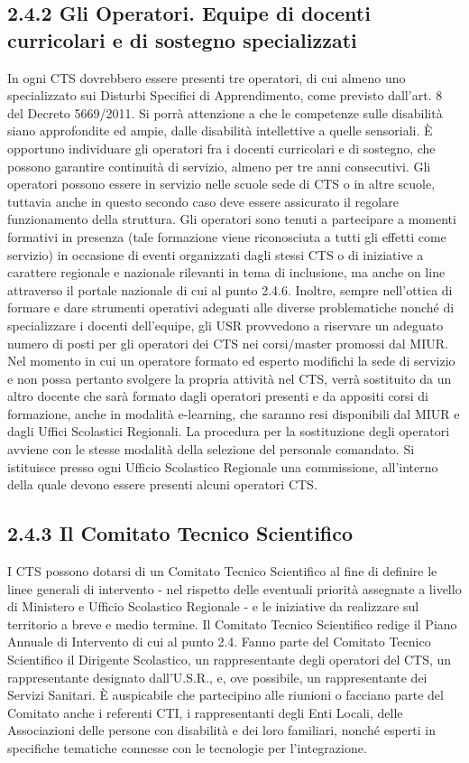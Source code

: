 \subsection*{2.4.2 Gli Operatori. Equipe di docenti curricolari e di sostegno specializzati}
In ogni CTS dovrebbero essere presenti tre operatori, di cui almeno uno specializzato sui Disturbi Specifici
di Apprendimento, come previsto dall'art. 8 del Decreto 5669/2011. Si porrà attenzione a che le competenze
sulle disabilità siano approfondite ed ampie, dalle disabilità intellettive a quelle sensoriali.
È opportuno individuare gli operatori fra i docenti curricolari e di sostegno, che possono garantire continuità
di servizio, almeno per tre anni consecutivi.
Gli operatori possono essere in servizio nelle scuole sede di CTS o in altre scuole, tuttavia anche in questo
secondo caso deve essere assicurato il regolare funzionamento della struttura.
Gli operatori sono tenuti a partecipare a momenti formativi in presenza (tale formazione viene riconosciuta a
tutti gli effetti come servizio) in occasione di eventi organizzati dagli stessi CTS o di iniziative a carattere
regionale e nazionale rilevanti in tema di inclusione, ma anche on line attraverso il portale nazionale di cui al
punto 2.4.6.
Inoltre, sempre nell'ottica di formare e dare strumenti operativi adeguati alle diverse problematiche nonché
di specializzare i docenti dell'equipe, gli USR provvedono a riservare un adeguato numero di posti per gli
operatori dei CTS nei corsi/master promossi dal MIUR.
Nel momento in cui un operatore formato ed esperto modifichi la sede di servizio e non possa pertanto
svolgere la propria attività nel CTS, verrà sostituito da un altro docente che sarà formato dagli operatori
presenti e da appositi corsi di formazione, anche in modalità e-learning, che saranno resi disponibili dal
MIUR e dagli Uffici Scolastici Regionali. La procedura per la sostituzione degli operatori avviene con le
stesse modalità della selezione del personale comandato. Si istituisce presso ogni Ufficio Scolastico
Regionale una commissione, all'interno della quale devono essere presenti alcuni operatori CTS.
\subsection*{2.4.3 Il Comitato Tecnico Scientifico}
I CTS possono dotarsi di un Comitato Tecnico Scientifico al fine di definire le linee generali di intervento -
nel rispetto delle eventuali priorità assegnate a livello di Ministero e Ufficio Scolastico Regionale - e le
iniziative da realizzare sul territorio a breve e medio termine.
Il Comitato Tecnico Scientifico redige il Piano Annuale di Intervento di cui al punto 2.4.
Fanno parte del Comitato Tecnico Scientifico il Dirigente Scolastico, un rappresentante degli operatori del
CTS, un rappresentante designato dall'U.S.R., e, ove possibile, un rappresentante dei Servizi Sanitari. È
auspicabile che partecipino alle riunioni o facciano parte del Comitato anche i referenti CTI, i rappresentanti
degli Enti Locali, delle Associazioni delle persone con disabilità e dei loro familiari, nonché esperti in
specifiche tematiche connesse con le tecnologie per l'integrazione.
